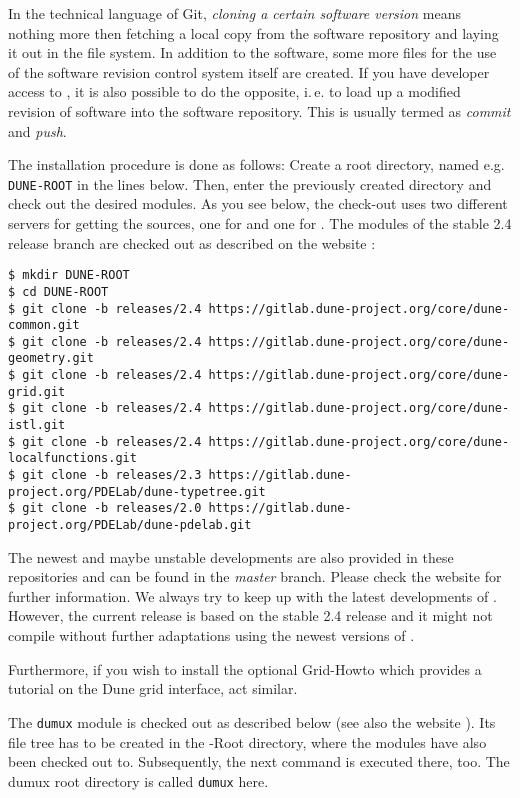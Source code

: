 In the technical language of Git, \emph{cloning a certain software version} means nothing more then fetching
a local copy from the software repository and laying it out in the file system.
In addition to the software, some more files for the use of the software revision
control system itself are created. If you have developer access to \Dumux, it is
also possible to do the opposite, i.\,e. to load up a modified revision of software
into the software repository. This is usually termed as \emph{commit} and \emph{push}.

The installation procedure is done as follows:
Create a  {\Dune} root directory, named e.g. \texttt{DUNE-ROOT} in the lines below.
Then, enter the previously created directory and check out the desired modules.
As you see below, the check-out uses two different servers for getting the sources,
one for \Dune and one for \Dumux.
The \Dune modules of the stable 2.4 release branch are checked out as described
on the \Dune website \cite{DUNE-DOWNLOAD-GIT}:

\begin{lstlisting}[style=Bash]
$ mkdir DUNE-ROOT
$ cd DUNE-ROOT
$ git clone -b releases/2.4 https://gitlab.dune-project.org/core/dune-common.git
$ git clone -b releases/2.4 https://gitlab.dune-project.org/core/dune-geometry.git
$ git clone -b releases/2.4 https://gitlab.dune-project.org/core/dune-grid.git
$ git clone -b releases/2.4 https://gitlab.dune-project.org/core/dune-istl.git
$ git clone -b releases/2.4 https://gitlab.dune-project.org/core/dune-localfunctions.git
$ git clone -b releases/2.3 https://gitlab.dune-project.org/PDELab/dune-typetree.git
$ git clone -b releases/2.0 https://gitlab.dune-project.org/PDELab/dune-pdelab.git
\end{lstlisting}

The newest and maybe unstable developments are also provided in these repositories and can be found in the \emph{master} branch.
Please check the \Dune website \cite{DUNE-DOWNLOAD-GIT} for further information. We always try to keep up with the latest developments of \Dune.
However, the current \Dumux release is based on the stable 2.4 release and it might not compile without further adaptations using the newest versions of \Dune.

Furthermore, if you wish to install the optional \Dune Grid-Howto which provides a tutorial
on the Dune grid interface, act similar.

The \texttt{dumux} module is checked out as described below (see also the \Dumux website \cite{DUMUX-HP}).
Its file tree has to be created in the \Dune-Root directory, where the \Dune modules
have also been checked out to. Subsequently, the next command
is executed there, too. The dumux root directory is called \texttt{dumux} here.

